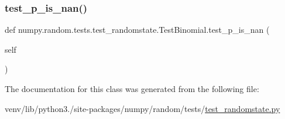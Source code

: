\mbox{\label{classnumpy_1_1random_1_1tests_1_1test__randomstate_1_1TestBinomial_ae10ba6ec820ec06ed74078ec5a4a7580}} 
\subsubsection{\texorpdfstring{test\+\_\+p\+\_\+is\+\_\+nan()}{test\_p\_is\_nan()}}
{\footnotesize\ttfamily def numpy.\+random.\+tests.\+test\+\_\+randomstate.\+Test\+Binomial.\+test\+\_\+p\+\_\+is\+\_\+nan (\begin{DoxyParamCaption}\item[{}]{self }\end{DoxyParamCaption})}



The documentation for this class was generated from the following file\+:\begin{DoxyCompactItemize}
\item 
venv/lib/python3./site-\/packages/numpy/random/tests/\hyperlink{test__randomstate_8py}{test\+\_\+randomstate.\+py}\end{DoxyCompactItemize}
